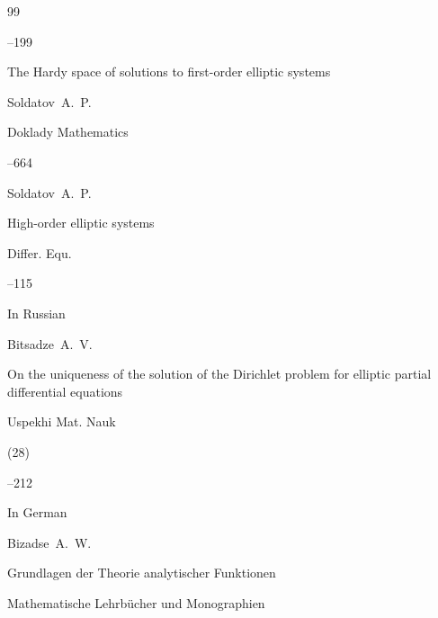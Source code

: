 \begin{thebibliography}{99}


--199






\paper The Hardy space of solutions to first-order elliptic systems

\by Soldatov~A.~P.

\jour Doklady Mathematics




--664








\by Soldatov~A.~P.

\paper High-order elliptic systems

\jour Differ. Equ.



--115 








\lang In Russian

\by Bitsadze~A.~V.

\paper On the uniqueness of the solution of the Dirichlet problem for elliptic partial differential equations

\jour Uspekhi Mat. Nauk



(28)

--212




\lang In German

\by Bizadse~A.~W.

\book Grundlagen der Theorie analytischer Funktionen

\serial Mathematische Lehrb\"ucher und Monographien


\end{thebibliography}
